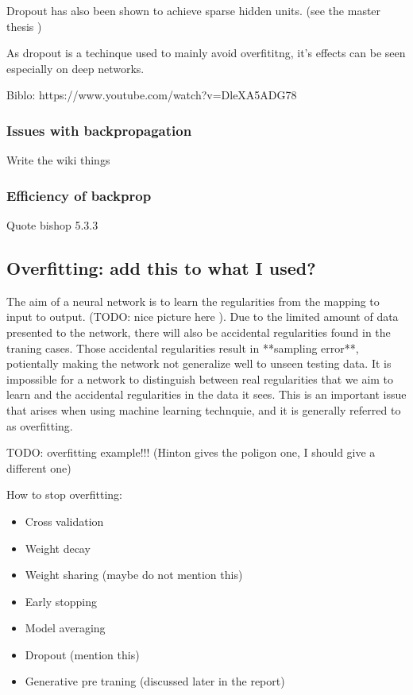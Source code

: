 \documentclass[11pt, fleqn, twoside]{article}
\begin{document}
  Dropout has also been shown to achieve sparse hidden units. (see the master thesis )

  As dropout is a techinque used to mainly avoid overfititng, it's effects can be seen especially on deep networks.

  Biblo: https://www.youtube.com/watch?v=DleXA5ADG78


\subsubsection{ Issues with backpropagation}
  Write the wiki things

\subsubsection{ Efficiency of backprop}
  Quote bishop 5.3.3

\subsection{Overfitting: add this to what I used?}

  The aim of a neural network is to learn the regularities from the mapping to input to output. (TODO: nice picture here ). Due to the limited amount of data presented to the network, there will also be accidental regularities found in the traning cases. Those accidental regularities result in **sampling error**, potientally making the network not generalize well to unseen testing data. It is impossible for a network to distinguish between real regularities that we aim to learn and the accidental regularities in the data it sees. This is an important issue that arises when using machine learning technquie, and it is generally referred to as overfitting.

  TODO: overfitting example!!! (Hinton gives the poligon one, I should give a different one)

  How to stop overfitting:

\begin{itemize}
  \item Cross validation
  \item Weight decay
  \item Weight sharing (maybe do not mention this)
  \item Early stopping
  \item Model averaging
  \item Dropout (mention this)
  \item Generative pre traning (discussed later in the report)
\end{itemize}
\end{document}

